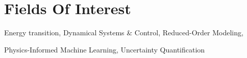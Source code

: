 \documentclass[11pt,a4paper,sans]{moderncv}        %
\begin{document}






\makecvtitle
\section{Fields Of Interest}
\hspace{1in}Energy transition, Dynamical Systems \& Control, Reduced-Order Modeling,

\hspace{1in}Physics-Informed Machine Learning, Uncertainty Quantification
\end{document}
